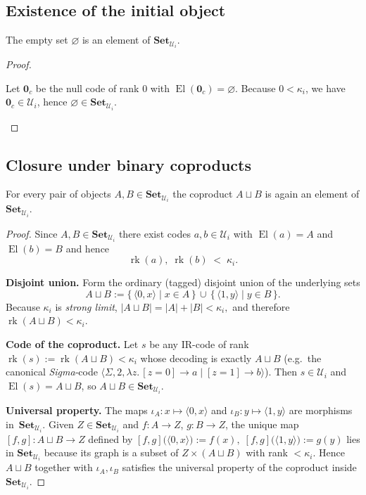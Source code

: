 \documentclass[a4paper,11pt]{article}
\newcommand{\Set}{\mathbf{Set}}
\newcommand{\El}{\operatorname{El}}          %
\newcommand{\rk}{\operatorname{rk}}          %
\begin{document}
\subsection{Existence of the initial object}
\begin{lemma}\label{lem:init}
The empty set\/ $\varnothing$ is an element of\/ $\Set_{\mathcal U_i}$.
\end{lemma}
\begin{proof}\begin{linenumbers}
Let $\mathbf 0_c$ be the null code of rank $0$ with $\El(\mathbf 0_c)=\varnothing$.
Because $0<\kappa_i$, we have $\mathbf 0_c\in\mathcal U_i$,
hence $\varnothing\in\Set_{\mathcal U_i}$.
\end{linenumbers}\end{proof}


\subsection{Closure under binary coproducts}
\begin{lemma}\label{lem:sum}
For every pair of objects $A,B\in\Set_{\mathcal U_i}$ the coproduct
$A\sqcup B$ is again an element of\/ $\Set_{\mathcal U_i}$.
\end{lemma}
\begin{proof}
Since $A,B\in\Set_{\mathcal U_i}$ there exist codes
$a,b\in\mathcal U_i$ with $\El(a)=A$ and $\El(b)=B$ and hence
\[
  \rk(a),\;\rk(b)\;<\;\kappa_i .
\]

\medskip\noindent
\textbf{Disjoint union.}
Form the ordinary (tagged) disjoint union of the underlying sets
\[
  A\sqcup B
     :=\{\,\langle 0,x\rangle\mid x\in A\,\}
       \,\cup\,
       \{\,\langle 1,y\rangle\mid y\in B\,\}.
\]
Because $\kappa_i$ is \emph{strong limit},
\(
  |A\sqcup B|
    =|A|+|B|
    <\kappa_i ,
\)
and therefore
\(
  \rk(A\sqcup B)<\kappa_i .
\)

\medskip\noindent
\textbf{Code of the coproduct.}
Let $s$ be any IR-code of rank
$\rk(s):=\rk(A\sqcup B)<\kappa_i$ whose decoding is exactly
$A\sqcup B$ (e.g.\ the canonical \emph{Sigma}‐code
$\langle\Sigma,2,\!\lambda z.\,[z=0]\!\to\!a\;|\;[z=1]\!\to\!b\rangle$).
Then $s\in\mathcal U_i$ and $\El(s)=A\sqcup B$,
so $A\sqcup B\in\Set_{\mathcal U_i}$.

\medskip\noindent
\textbf{Universal property.}
The maps
\(
  \iota_A:x\mapsto\langle 0,x\rangle
\)
and
\(
  \iota_B:y\mapsto\langle 1,y\rangle
\)
are morphisms in~$\Set_{\mathcal U_i}$.
Given $Z\in\Set_{\mathcal U_i}$ and
$f:A\to Z$, $g:B\to Z$, the unique map
$[f,g]:A\sqcup B\to Z$ defined by
\(
  [f,g]\bigl(\langle 0,x\rangle\bigr):=f(x),\;
  [f,g]\bigl(\langle 1,y\rangle\bigr):=g(y)
\)
lies in $\Set_{\mathcal U_i}$ because its graph is a subset of
$Z\times (A\sqcup B)$ with rank $<\kappa_i$.
Hence $A\sqcup B$ together with $\iota_A,\iota_B$ satisfies the
universal property of the coproduct inside $\Set_{\mathcal U_i}$.
\end{proof}
\end{document}
